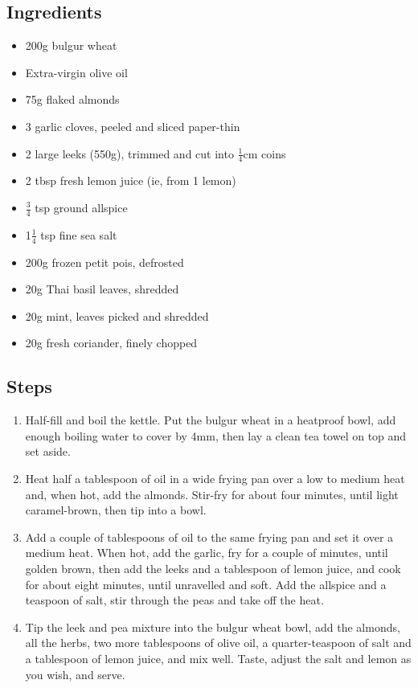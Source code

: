 \documentclass{book}
\begin{document}
\subsection*{Ingredients}
\begin{itemize}
\item 200g bulgur wheat
\item Extra-virgin olive oil
\item 75g flaked almonds
\item 3 garlic cloves, peeled and sliced paper-thin
\item 2 large leeks (550g), trimmed and cut into $\frac{1}{4}$cm coins
\item 2 tbsp fresh lemon juice (ie, from 1 lemon)
\item $\frac{3}{4}$ tsp ground allspice
\item 1$\frac{1}{4}$ tsp fine sea salt
\item 200g frozen petit pois, defrosted
\item 20g Thai basil leaves, shredded
\item 20g mint, leaves picked and shredded
\item 20g fresh coriander, finely chopped
\end{itemize}

\subsection*{Steps}
\begin{enumerate}
\item Half-fill and boil the kettle. Put the bulgur wheat in a heatproof bowl, add enough boiling water to cover by 4mm, then lay a clean tea towel on top and set aside.
\item Heat half a tablespoon of oil in a wide frying pan over a low to medium heat and, when hot, add the almonds. Stir-fry for about four minutes, until light caramel-brown, then tip into a bowl.
\item Add a couple of tablespoons of oil to the same frying pan and set it over a medium heat. When hot, add the garlic, fry for a couple of minutes, until golden brown, then add the leeks and a tablespoon of lemon juice, and cook for about eight minutes, until unravelled and soft. Add the allspice and a teaspoon of salt, stir through the peas and take off the heat.
\item Tip the leek and pea mixture into the bulgur wheat bowl, add the almonds, all the herbs, two more tablespoons of olive oil, a quarter-teaspoon of salt and a tablespoon of lemon juice, and mix well. Taste, adjust the salt and lemon as you wish, and serve.
\end{enumerate}
\newpage
\end{document}

